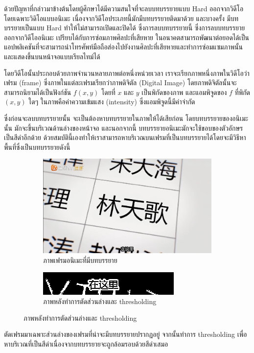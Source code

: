 \documentclass[hidelinks,a4paper,14pt]{article}
\numberwithin{equation}{section}							%
\begin{document}
{	ด้วยปัญหาที่กล่าวมาข้างต้นโดยผู้ศึกษาได้มีความสนใจที่จะลบบทบรรยายแบบ Hard ออกจากวิดีโอ โดยเฉพาะวิดิโอแบบอนิเมะ เนื่องจากวิดีโอประเภทนี้มักมีบทบรรยายติดมาด้วย และบางครั้ง มีบทบรรยายเป็นแบบ Hard ทำให้ไม่สามารถเปิดและปิดได้ ซึ่งการลบบทบรรยายนี้ ซึ่งการลบบทบรรยายออกจากวิดีโออนิเมะ เปรียบได้กับการซ่อมภาพศิลปะที่เสียหาย ในอนาคตสามารถพัฒนาต่อยอดได้เป็นแอปพลิเคชันที่จะสามารถนำโทรศัพท์มือถือส่องไปยังงานศิลปะที่เสียหายและทำการซ่อมแซมภาพนั้นและแสดงขึ้นบนหน้าจอแบบเรียลไทม์ได้\newline
	
	โดยวิดีโอนั้นประกอบด้วยภาพจำนวนหลายภาพต่อหนึ่งหน่วยเวลา เราจะเรียกภาพหนึ่งภาพในวิดีโอว่า เฟรม (frame) ซึ่งภาพในแต่ละเฟรมเรียกว่าภาพดิจิตัล (Digital Image) โดยภาพดิจิตัลนั้นจะสามารถนิยามได้เป็นฟังก์ชัน $f(x,y)$ โดยที่ $x$ และ $y$ เป็นพิกัดของภาพ และแอมพิจูดของ $f$ ที่พิกัด $(x,y)$ ใดๆ ในภาพคือค่าความเข้มแสง (intensity)  ซึ่งแอมพิจูดนี้มีค่าจำกัด\newline
	
	ซึ่งก่อนจะลบบทบรรยายนั้น จะเป็นต้องหาบทบรรยายในภาพให้ได้เสียก่อน โดยบทบรรยายของอนิเมะนั้น มักจะขึ้นบริเวณด้านล่างของหน้าจอ และนอกจากนี้ บทบรรยายอนิเมะมักจะใช้ขอบของตัวอักษรเป็นสีดำอีกด้วย ด้วยสมบัตินี้เองทำให้เราสามารถหาบริเวณบนเฟรมที่เป็นบทบรรยายได้โดยจะมีวิธีหาพื้นที่ซึ่งเป็นบทบรรยายดังนี้
	
	\begin{figure}[H]
		\begin{subfigure}{0.4\linewidth}
			\centering
			\includegraphics[width=0.4\linewidth]{images/detection-original.png}
			\caption{ภาพเฟรมอนิเมะที่มีบทบรรยาย}
		\end{subfigure}
		\begin{subfigure}{0.4\linewidth}
			\centering
			\includegraphics[width=0.4\linewidth]{images/detection-threshold.png}
			\caption{ภาพหลังทำการตัดส่วนล่างและ thresholding}
		\end{subfigure}
	\end{figure}
	
ตัดเฟรมมาเฉพาะส่วนล่างของเฟรมที่น่าจะมีบทบรรยายปรากฏอยู่ จากนั้นทำการ thresholding เพื่อหาบริเวณที่เป็นสีดำเนื่องจากบทบรรยายจะถูกล้อมรอบด้วยสีดำเสมอ

}
\end{document}
